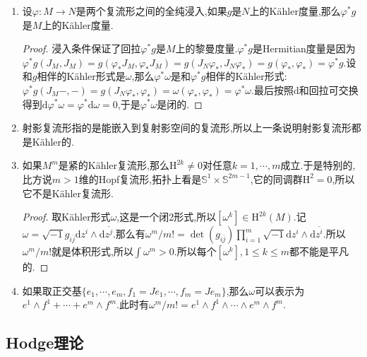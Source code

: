 \begin{enumerate}
	\item 设$\varphi:M\to N$是两个复流形之间的全纯浸入,如果$g$是$N$上的K\"ahler度量,那么$\varphi^*g$是$M$上的K\"ahler度量.
	\begin{proof}
		
		浸入条件保证了回拉$\varphi^*g$是$M$上的黎曼度量.$\varphi^*g$是Hermitian度量是因为$\varphi^*g(J_M,J_M)=g(\varphi_*J_M,\varphi_*J_M)=g(J_N\varphi_*,J_N\varphi_*)=g(\varphi_*,\varphi_*)=\varphi^*g$.设和$g$相伴的K\"ahler形式是$\omega$,那么$\varphi^*\omega$是和$\varphi^*g$相伴的K\"ahler形式:$\varphi^*g(J_M-,-)=g(J_N\varphi_*,\varphi_*)=\omega(\varphi_*,\varphi_*)=\varphi^*\omega$.最后按照$\mathrm{d}$和回拉可交换得到$\mathrm{d}\varphi^*\omega=\varphi^*\mathrm{d}\omega=0$,于是$\varphi^*\omega$是闭的.
	\end{proof}
    \item 射影复流形指的是能嵌入到复射影空间的复流形,所以上一条说明射影复流形都是K\"ahler的.
    \item 如果$M^m$是紧的K\"ahler复流形,那么$\mathrm{H}^{2k}\not=0$对任意$k=1,\cdots,m$成立.于是特别的,比方说$m>1$维的Hopf复流形,拓扑上看是$\mathbb{S}^1\times\mathbb{S}^{2m-1}$,它的同调群$\mathrm{H}^2=0$,所以它不是K\"ahler复流形.
    \begin{proof}
    	
    	取K\"ahler形式$\omega$,这是一个闭2形式,所以$[\omega^k]\in\mathrm{H}^{2k}(M)$.记$\omega=\sqrt{-1}g_{i\overline{j}}\mathrm{d}z^i\wedge\mathrm{d}\overline{z^j}$.那么有$\omega^m/m!=\det\left(g_{i\overline{j}}\right)\prod_{i=1}^m\sqrt{-1}\mathrm{d}z^i\wedge\mathrm{d}\overline{z^i}$.所以$\omega^m/m!$就是体积形式,所以$\int\omega^m>0$.所以每个$[\omega^k],1\le k\le m$都不能是平凡的.
    \end{proof}
    \item 如果取正交基$\{e_1,\cdots,e_m,f_1=Je_1,\cdots,f_m=Je_m\}$,那么$\omega$可以表示为$e^1\wedge f^1+\cdots+e^m\wedge f^m$.此时有$\omega^m/m!=e^1\wedge f^1\wedge\cdots\wedge e^m\wedge f^m$.
\end{enumerate}




\newpage
\subsection{Hodge理论}






